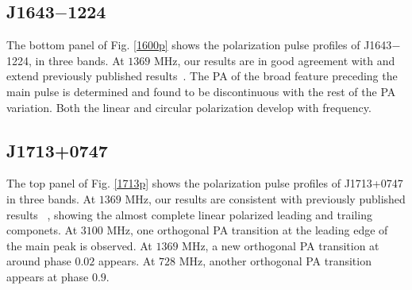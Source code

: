 \documentclass[useAMS,usenatbib]{mn2e}
\begin{document}
%
%
%


\subsection{J1643$-$1224}

The bottom panel of Fig. \ref{1600p} shows the polarization pulse profiles of 
J1643$-$1224, in three bands.
%
At $1369$ MHz, our results are in good agreement with and extend previously published
results~\citep{Ord04,Yan11}.
%
The PA of the broad feature preceding the main pulse is determined and found to be 
discontinuous with the rest of the PA variation.
%
Both the linear and circular polarization develop with frequency.


\subsection{J1713+0747}

The top panel of Fig. \ref{1713p} shows the polarization pulse profiles of J1713+0747 
in three bands.
%
At $1369$ MHz, our results are consistent with previously published results
~\citep{Ord04,Yan11}, showing the almost complete linear polarized leading and 
trailing componets.
%
At $3100$ MHz, one orthogonal PA transition at the leading edge of the main peak 
is observed. At $1369$ MHz, a new orthogonal PA transition at around phase $0.02$
appears. At $728$ MHz, another orthogonal PA transition appears at phase $0.9$.
%
\end{document}
